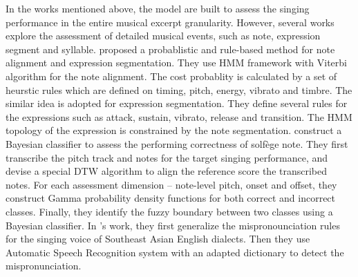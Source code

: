In the works mentioned above, the model are built to assess the singing performance in the entire musical excerpt granularity. However, several works explore the assessment of detailed musical events, such as note, expression segment and syllable.  proposed a probablistic and rule-based method for note alignment and expression segmentation. They use HMM framework with Viterbi algorithm for the note alignment. The cost probablity is calculated by a set of heurstic rules which are defined on timing, pitch, energy, vibrato and timbre. The similar idea is adopted for expression segmentation. They define several rules for the expressions such as attack, sustain, vibrato, release and transition. The HMM topology of the expression is constrained by the note segmentation.  construct a Bayesian classifier to assess the performing correctness of solfège note. They first transcribe the pitch track and notes for the target singing performance, and devise a special DTW algorithm to align the reference score the transcribed notes. For each assessment dimension -- note-level pitch, onset and offset, they construct Gamma probability density functions for both correct and incorrect classes. Finally, they identify the fuzzy boundary between two classes using a Bayesian classifier. In 's work, they first generalize the mispronounciation rules for the singing voice of Southeast Asian English dialects. Then they use Automatic Speech Recognition system with an adapted dictionary to detect the mispronunciation.

